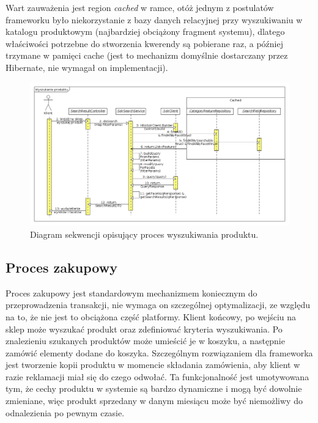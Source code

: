 Wart zauważenia jest region \textit{cached} w ramce, otóż jednym z postulatów frameworku było niekorzystanie z bazy danych relacyjnej przy wyszukiwaniu w katalogu produktowym (najbardziej obciążony fragment systemu), dlatego właściwości potrzebne do stworzenia kwerendy są pobierane raz, a później trzymane w pamięci cache (jest to mechanizm domyślnie dostarczany przez Hibernate, nie wymagał on implementacji). 
  \begin{figure}
	\begin{center}
		\includegraphics[scale=0.38]{wyszukanieProdSekw.png}
	\end{center}
	\caption{{\color{black}Diagram sekwencji opisujący proces wyszukiwania produktu.}} \label{wyszukiwanieProdSekw}
\end{figure}



\subsection{Proces zakupowy}
Proces zakupowy jest standardowym mechanizmem koniecznym do przeprowadzenia transakcji, nie wymaga on szczególnej optymalizacji, ze względu na to, że nie jest to obciążona część platformy. Klient końcowy, po wejściu na sklep może wyszukać produkt oraz zdefiniować kryteria wyszukiwania. Po znalezieniu szukanych produktów może umieścić je w koszyku, a następnie zamówić elementy dodane do koszyka. Szczególnym rozwiązaniem dla frameworka jest tworzenie kopii produktu w momencie składania zamówienia, aby klient w razie reklamacji miał się do czego odwołać. Ta funkcjonalność jest umotywowana tym, że cechy produktu w systemie są bardzo dynamiczne i mogą być dowolnie zmieniane, więc produkt sprzedany w danym miesiącu może być niemożliwy do odnalezienia po pewnym czasie.



